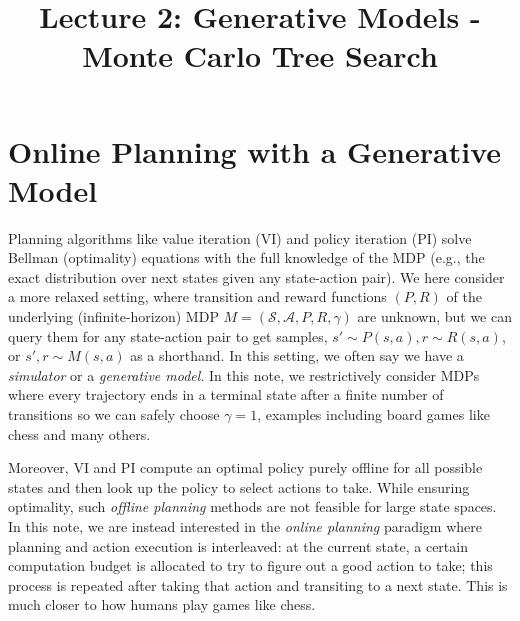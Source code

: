 \title{Lecture 2: Generative Models - Monte Carlo Tree Search}

\section{Online Planning with a Generative Model}
Planning algorithms like value iteration (VI) and policy iteration (PI) solve Bellman (optimality) equations with the full knowledge of the MDP (e.g., the exact distribution over next states given any state-action pair).
We here consider a more relaxed setting, where transition and reward functions $(P, R)$ of the underlying (infinite-horizon) MDP $M=(\mathcal{S},\mathcal{A},P,R,\gamma)$ are unknown, but we can query them for any state-action pair to get samples, $s'\sim P(s,a), r\sim R(s,a)$, or $s',r\sim M(s,a)$ as a shorthand.
In this setting, we often say we have a {\em simulator} or a {\em generative model}.
In this note, we restrictively consider MDPs where every trajectory ends in a terminal state after a finite number of transitions so we can safely choose $\gamma=1$, examples including board games like chess and many others.

Moreover, VI and PI compute an optimal policy purely offline for all possible states and then look up the policy to select actions to take. While ensuring optimality, such {\em offline planning} methods are not feasible for large state spaces.
In this note, we are instead interested in the {\em online planning} paradigm where planning and action execution is interleaved: 
at the current state, a certain computation budget is allocated to try to figure out a good action to take; this process is repeated after taking that action and transiting to a next state.
This is much closer to how humans play games like chess.

